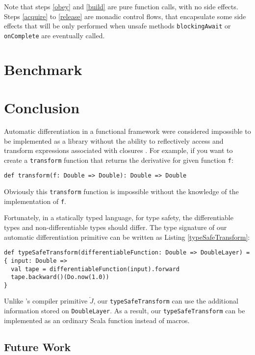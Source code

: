 Note that steps \ref{obey} and \ref{build} are pure function calls, with no side effects. Steps \ref{acquire} to \ref{release} are monadic control flows, that encapsulate some side effects that will be only performed when unsafe methods \lstinline{blockingAwait} or \lstinline{onComplete} are eventually called.

\section{Benchmark}

\section{Conclusion}

Automatic differentiation in a functional framework were considered impossible to be implemented as a library without the ability to reflectively access and
transform expressions associated with closures \cite{pearlmutter2008reverse}. For example, if you want to create a \lstinline{transform} function that returns the derivative for given function \lstinline{f}:

\begin{lstlisting}[float={htbp},caption={Impossible transform function for automatic differentiation}, label={transform}]
def transform(f: Double => Double): Double => Double
\end{lstlisting}

Obviously this \lstinline{transform} function is impossible without the knowledge of the implementation of \lstinline{f}.

Fortunately, in a statically typed language, for type safety, the differentiable types and non-differentiable types should differ. The type signature of our automatic differentiation primitive can be written as Listing \ref{typeSafeTransform}:

\begin{lstlisting}[float={htbp},caption={Type safe transform function for automatic differentiation}, label={typeSafeTransform}]
def typeSafeTransform(differentiableFunction: Double => DoubleLayer) = { input: Double =>
  val tape = differentiableFunction(input).forward
  tape.backward()(Do.now(1.0))
}
\end{lstlisting}

Unlike \cite{pearlmutter2008reverse}'s compiler primitive $\overleftarrow{J}$, our \lstinline{typeSafeTransform} can use the additional information stored on \lstinline{DoubleLayer}. As a result, our \lstinline{typeSafeTransform} can be implemented as an ordinary Scala function instead of macros.

\subsection{Future Work}

\clearpage
\appendix

\printglossary

\begin{acks}
\end{acks}


